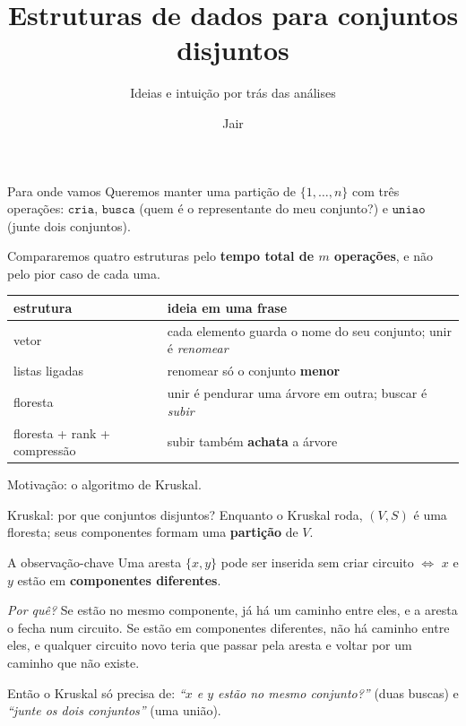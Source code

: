\documentclass[aspectratio=169,10pt]{beamer}
\title[Conjuntos disjuntos]{Estruturas de dados para conjuntos disjuntos}
\subtitle{Ideias e intuição por trás das análises}
\author{Jair}
\institute{CMCC -- UFABC}
\date{}
\newcommand{\Cria}{\mathtt{cria}}
\newcommand{\Busca}{\mathtt{busca}}
\newcommand{\Uniao}{\mathtt{uniao}}
\begin{document}
\begin{frame}[plain]
  \titlepage
\end{frame}

\begin{frame}[t]{Para onde vamos}
  \small
  Queremos manter uma partição de $\{1,\dots,n\}$ com três operações:
  $\Cria$, $\Busca$ (quem é o representante do meu conjunto?) e
  $\Uniao$ (junte dois conjuntos).

  \medskip
  Compararemos quatro estruturas pelo \textbf{tempo total de $m$
    operações}, e não pelo pior caso de cada uma.

  \medskip
  \begin{center}
    \renewcommand{\arraystretch}{1.3}
    \begin{tabular}{|l|l|}\hline
      \textbf{estrutura} & \textbf{ideia em uma frase}\\\hline
      vetor & cada elemento guarda o nome do seu conjunto; unir é
      \textit{renomear}\\\hline
      listas ligadas & renomear só o conjunto \textbf{menor}\\\hline
      floresta & unir é pendurar uma árvore em outra; buscar é
      \textit{subir}\\\hline
      floresta + rank + compressão & subir também \textbf{achata} a árvore\\\hline
    \end{tabular}
  \end{center}

  \medskip
  Motivação: o algoritmo de Kruskal.
\end{frame}

\begin{frame}[t]{Kruskal: por que conjuntos disjuntos?}
  \small
  Enquanto o Kruskal roda, $(V,S)$ é uma floresta; seus componentes
  formam uma \textbf{partição} de $V$.

  \medskip
  \begin{block}{A observação-chave}
    Uma aresta $\{x,y\}$ pode ser inserida sem criar circuito
    $\iff$ $x$ e $y$ estão em \textbf{componentes diferentes}.
  \end{block}
  \textit{Por quê?}  Se estão no mesmo componente, já há um caminho
  entre eles, e a aresta o fecha num circuito.  Se estão em componentes
  diferentes, não há caminho entre eles, e qualquer circuito novo teria
  que passar pela aresta e voltar por um caminho que não existe.

  \medskip
  Então o Kruskal só precisa de: \textit{``$x$ e $y$ estão no mesmo
    conjunto?''} (duas buscas) e \textit{``junte os dois conjuntos''}
  (uma união).
\end{frame}
\end{document}
